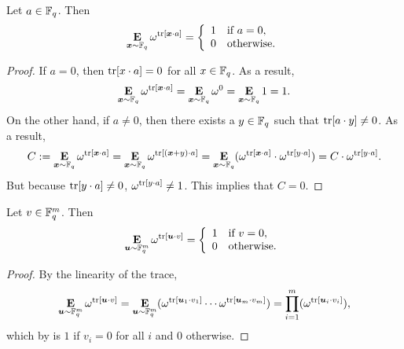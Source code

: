 \begin{proposition}
\label{prop:fourier-fact-scalar}
Let $a \in \mathbb F_q$. Then
\begin{equation*}
\mathop{\bf E\/}_{{\boldsymbol{x}} \sim \mathbb F_q} \omega^{\mathrm{tr}[{\boldsymbol{x}} \cdot a]}
= \left\{\begin{array}{rl}
	1 & \text{if $a = 0$},\\
	0 & \text{otherwise}.
	\end{array}\right.
\end{equation*}
\end{proposition}
\begin{proof}
If $a = 0$, then $\mathrm{tr}[x \cdot a] = 0$ for all $x \in \mathbb F_q$.
As a result,
\begin{equation*}
\mathop{\bf E\/}_{{\boldsymbol{x}} \sim \mathbb F_q} \omega^{\mathrm{tr}[{\boldsymbol{x}} \cdot a]}
= \mathop{\bf E\/}_{{\boldsymbol{x}} \sim \mathbb F_q} \omega^{0}
= \mathop{\bf E\/}_{{\boldsymbol{x}} \sim \mathbb F_q} 1
= 1.
\end{equation*}
On the other hand, if $a \neq 0$, then there exists a $y \in \mathbb F_q$
such that $\mathrm{tr}[a \cdot y] \neq 0$. As a result,
\begin{equation*}
C
:= \mathop{\bf E\/}_{{\boldsymbol{x}} \sim \mathbb F_q} \omega^{\mathrm{tr}[{\boldsymbol{x}} \cdot a]}
= \mathop{\bf E\/}_{{\boldsymbol{x}} \sim \mathbb F_q} \omega^{\mathrm{tr}[({\boldsymbol{x}}+y) \cdot a]}
= \mathop{\bf E\/}_{{\boldsymbol{x}} \sim \mathbb F_q} (\omega^{\mathrm{tr}[{\boldsymbol{x}} \cdot a]} \cdot \omega^{\mathrm{tr}[y \cdot a]})
= C \cdot \omega^{\mathrm{tr}[y\cdot a]}.
\end{equation*}
But because $\mathrm{tr}[y \cdot a] \neq 0$,
$\omega^{\mathrm{tr}[y\cdot a]} \neq 1$.
This implies that $C = 0$.
\end{proof}


\begin{proposition}
\label{prop:fourier-fact-vector}
Let $v \in \mathbb F_q^m$. Then
\begin{equation*}
\mathop{\bf E\/}_{\boldsymbol{u} \sim \mathbb F_q^m} \omega^{\mathrm{tr}[\boldsymbol{u} \cdot v]}
= \left\{\begin{array}{rl}
	1 & \text{if $v = 0$},\\
	0 & \text{otherwise}.
	\end{array}\right.
\end{equation*}
\end{proposition}
\begin{proof}
By the linearity of the trace,
\begin{equation*}
\mathop{\bf E\/}_{\boldsymbol{u} \sim \mathbb F_q^m} \omega^{\mathrm{tr}[\boldsymbol{u} \cdot v]}
= \mathop{\bf E\/}_{\boldsymbol{u} \sim \mathbb F_q^m} (\omega^{\mathrm{tr}[\boldsymbol{u}_1 \cdot v_1]} \cdots \omega^{\mathrm{tr}[\boldsymbol{u}_m \cdot v_m]})
= \prod_{i=1}^m (\omega^{\mathrm{tr}[\boldsymbol{u}_i \cdot v_i]}),
\end{equation*}
which by  is $1$ if $v_i = 0$ for all $i$ and $0$ otherwise.
\end{proof}



